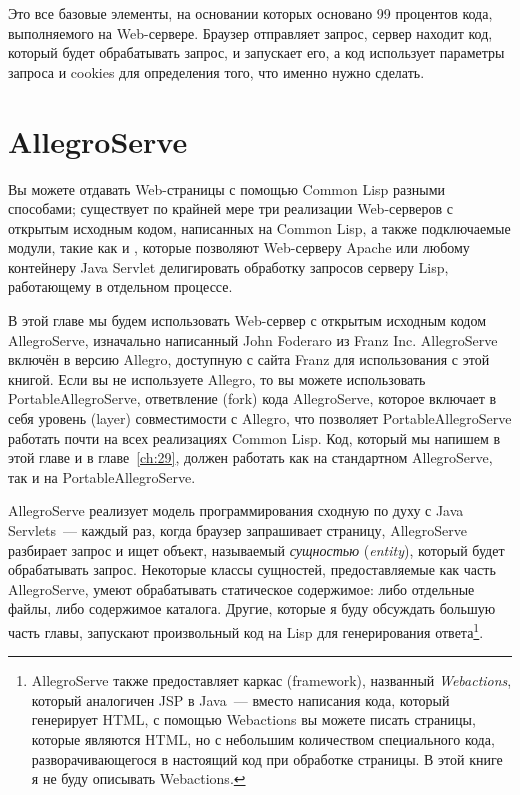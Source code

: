 Это все базовые элементы, на основании которых основано 99 процентов кода, выполняемого на
Web-сервере. Браузер отправляет запрос, сервер находит код, который будет обрабатывать
запрос, и запускает его, а код использует параметры запроса и cookies для определения
того, что именно нужно сделать.

\section{AllegroServe}

Вы можете отдавать Web-страницы с помощью Common Lisp разными способами; существует по
крайней мере три реализации Web-серверов с открытым исходным кодом, написанных на Common
Lisp, а также подключаемые модули, такие как
 и
, которые позволяют Web-серверу Apache
или любому контейнеру Java Servlet делигировать обработку запросов серверу Lisp,
работающему в отдельном процессе.

В этой главе мы будем использовать Web-сервер с открытым исходным кодом AllegroServe,
изначально написанный John Foderaro из Franz Inc. AllegroServe включён в версию Allegro,
доступную с сайта Franz для использования с этой книгой. Если вы не используете Allegro,
то вы можете использовать PortableAllegroServe, ответвление (fork) кода AllegroServe,
которое включает в себя уровень (layer) совместимости с Allegro, что позволяет
PortableAllegroServe работать почти на всех реализациях Common Lisp. Код, который мы
напишем в этой главе и в главе~\ref{ch:29}, должен работать как на стандартном
AllegroServe, так и на PortableAllegroServe.

AllegroServe реализует модель программирования сходную по духу с Java Servlets~--- каждый
раз, когда браузер запрашивает страницу, AllegroServe разбирает запрос и ищет объект,
называемый \textit{сущностью} (\textit{entity}), который будет обрабатывать
запрос. Некоторые классы сущностей, предоставляемые как часть AllegroServe, умеют
обрабатывать статическое содержимое: либо отдельные файлы, либо содержимое
каталога. Другие, которые я буду обсуждать большую часть главы, запускают произвольный код
на Lisp для генерирования ответа\footnote{AllegroServe также предоставляет каркас
  (framework), названный \textit{Webactions}, который аналогичен JSP в Java~--- вместо
  написания кода, который генерирует HTML, с помощью Webactions вы можете писать страницы,
  которые являются HTML, но с небольшим количеством специального кода, разворачивающегося
  в настоящий код при обработке страницы. В этой книге я не буду описывать Webactions.}.

